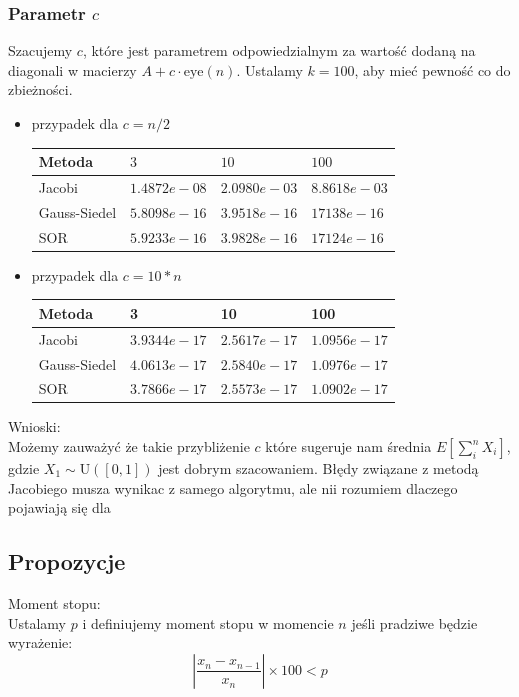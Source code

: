 \documentclass[a4paper, 11pt]{article}
\begin{document}
\subsubsection{Parametr $c$}
Szacujemy \( c \), które jest parametrem odpowiedzialnym za wartość dodaną na diagonali w macierzy \( A + c \cdot \text{eye}(n) \). Ustalamy \( k = 100 \), aby mieć pewność co do zbieżności.
\begin{itemize}
    \item przypadek dla $c = n/2$
\begin{center}
\begin{tabular}{|l|l|l|l|}
\hline
Metoda       & $3$            & $10$           & $100$          \\ \hline
Jacobi       & $1.4872e-08$ & $2.0980e-03$ & $8.8618e-03$ \\ \hline
Gauss-Siedel & $5.8098e-16$ & $3.9518e-16$ & $17138e-16$  \\ \hline
SOR          & $5.9233e-16$ & $3.9828e-16$ & $17124e-16$  \\ \hline
\end{tabular}
\end{center}
    \item przypadek dla $c = 10*n$
    \begin{center}
\begin{tabular}{|l|l|l|l|}
\hline
Metoda       & 3            & 10           & 100          \\ \hline
Jacobi       & $3.9344e-17$ & $2.5617e-17$ & $1.0956e-17$ \\ \hline
Gauss-Siedel & $4.0613e-17$ & $2.5840e-17$ & $1.0976e-17$ \\ \hline
SOR          & $3.7866e-17$ & $2.5573e-17$ & $1.0902e-17$ \\ \hline
\end{tabular}
    \end{center}
\end{itemize}
Wnioski:\\
Możemy zauważyć że takie przybliżenie $c$ które sugeruje nam średnia $E[\sum_i^n X_i]$, gdzie $X_1 \sim \mathrm{U}([0, 1])$ jest dobrym szacowaniem. Błędy związane z metodą Jacobiego musza wynikac z samego algorytmu, ale nii rozumiem dlaczego pojawiają się dla 
\subsection{Propozycje}
Moment stopu:\\
Ustalamy $p$ i definiujemy moment stopu w momencie $n$ jeśli pradziwe będzie wyrażenie:
$$\left|\frac{x_n - x_{n-1}}{x_n}\right| \times 100 < p$$




% 
\end{document}
